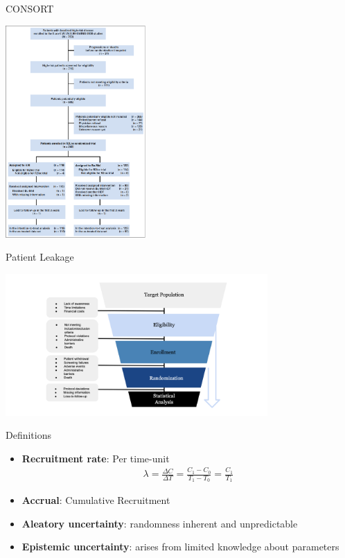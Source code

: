 \documentclass[english]{beamer}\usepackage[]{graphicx}\usepackage[]{xcolor}
\begin{document}
\begin{frame}{CONSORT}
\begin{center}
\includegraphics[width=0.4\textwidth]{whelan_flow.png}
\end{center}
\end{frame}


\begin{frame}{Patient Leakage}

\includegraphics[width=100mm,scale=1]{attrition.png}

\end{frame}


\begin{frame}{Definitions}

\begin{itemize}
\item \textbf{Recruitment rate}: Per time-unit \citep{piantadosi2024clinical}
\begin{align*}
\lambda = \frac{\Delta C}{\Delta T} = \frac{C_1 - C_0}{T_1 - T_0} = \frac{C_1}{T_1}
\end{align*}

\item \textbf{Accrual}: Cumulative Recruitment
\item \textbf{Aleatory uncertainty}: randomness inherent and unpredictable
\item \textbf{Epistemic uncertainty}: arises from limited knowledge about parameters



\end{itemize}


\end{frame}
\end{document}
